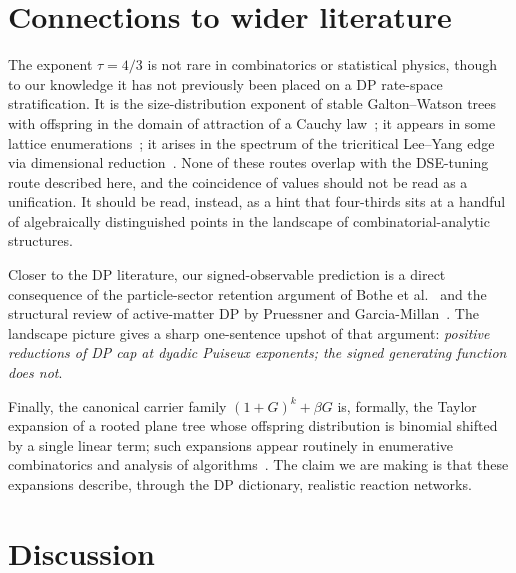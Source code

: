 \documentclass[11pt,a4paper]{article}
\theoremstyle{plain}
\theoremstyle{remark}
\begin{document}
\section{Connections to wider literature}
\label{sec:connections}

The exponent $\tau = 4/3$ is not rare in combinatorics or
statistical physics, though to our knowledge it has not
previously been placed on a DP rate-space stratification.  It
is the size-distribution exponent of stable Galton--Watson
trees with offspring in the domain of attraction of a Cauchy
law~\citep{DuquesneLeGall2002}; it appears in some lattice
enumerations~\citep{JensenGuttmann2000}; it arises in the
spectrum of the tricritical Lee--Yang edge via dimensional
reduction~\citep{Parisi1981,BrydgesImbrie2003}.  None of these
routes overlap with the DSE-tuning route described here, and
the coincidence of values should not be read as a unification.
It should be read, instead, as a hint that four-thirds sits at
a handful of algebraically distinguished points in the landscape
of combinatorial-analytic structures.

Closer to the DP literature, our signed-observable prediction
is a direct consequence of the particle-sector retention
argument of Bothe et al.~\citep{Bothe2023} and the structural
review of active-matter DP by Pruessner and
Garcia-Millan~\citep{PruessnerGarciaMillan2025}.  The landscape
picture gives a sharp one-sentence upshot of that argument:
\emph{positive reductions of DP cap at dyadic Puiseux
exponents; the signed generating function does not}.

Finally, the canonical carrier family $(1+G)^{k}+\beta G$ is,
formally, the Taylor expansion of a rooted plane tree whose
offspring distribution is binomial shifted by a single linear
term; such expansions appear routinely in enumerative
combinatorics and analysis of algorithms~\citep{FlajoletSedgewick}.
The claim we are making is that these expansions describe,
through the DP dictionary, realistic reaction networks.

\section{Discussion}
\label{sec:disc}
\end{document}
